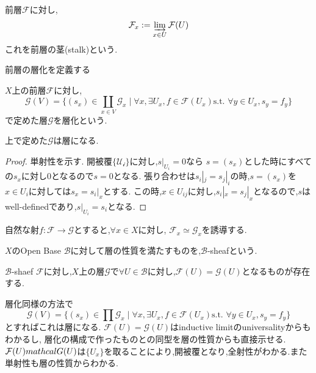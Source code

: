 前層$\mathcal{F}$に対し,
\begin{equation*}
    \mathcal{F}_x := \varinjlim_{x \in U}\mathcal{F}(U)
\end{equation*}
これを前層の茎(stalk)という.

前層の層化を定義する
\begin{screen}
\begin{dfn}[層化]
$X$上の前層$\mathcal{F}$に対し,
\begin{equation*}
\mathcal{G}(V)= \{ (s_x) \in \coprod_{x \in V} \mathcal{G}_x \mid \forall x, \exists U_x ,f  \in \mathcal{F}(U_x) \mbox{s.t. } \forall y \in U_x, s_y = f_y \}
\end{equation*}
で定めた層$\mathcal{G}$を層化という.
\end{dfn}
\end{screen}


\begin{lem}
上で定めた$\mathcal{G}$は層になる.
\end{lem}
\begin{proof}
単射性を示す.
開被覆$\{\mathcal{U_i}\}$に対し,$s|_{U_i} = 0$なら
$s = (s_x)$とした時にすべての$s_x$に対し$0$となるので$s = 0$となる.
張り合わせは$s_i|_j = s_j|_i$の時,$s = (s_x)$を$x \in U_i$に対しては$s_x =s_i|_x$とする.
この時,$x \in U_{ij}$に対し,$s_i|_x = s_j|_x$となるので,$s$はwell-definedであり,$s|_{U_i} = s_i$となる.
\end{proof}

\begin{lem}
自然な射$f: \mathcal{F} \to \mathcal{G}$とすると,$\forall x \in X$に対し,
$\mathcal{F}_x \simeq \mathcal{G}_x$を誘導する.
\end{lem}


\begin{screen}
\begin{dfn}
$X$のOpen Base $\mathcal{B}$に対して層の性質を満たすものを,$\mathcal{B}$-sheafという.
\end{dfn}
\end{screen}

\begin{lem}
$\mathcal{B}$-shaef $\mathcal{F}$に対し,$X$上の層$\mathcal{G}$で$\forall U \in \mathcal{B}$に対し,$\mathcal{F}(U) = \mathcal{G}(U)$となるものが存在する.
\end{lem}
層化同様の方法で
\begin{equation*}
\mathcal{G}(V)= \{ (s_x) \in \prod \mathcal{G}_x \mid \forall x, \exists U_x ,f  \in \mathcal{F}(U_x) \mbox{s.t. } \forall y \in U_x, s_y = f_y \}
\end{equation*}
とすればこれは層になる.
$\mathcal{F}(U) = \mathcal{G}(U)$はinductive limitのuniversalityからもわかるし,
層化の構成で作ったものとの同型を層の性質からも直接示せる.
$\mathcal{F}(U) \\mathcal{G}(U)$は$\{U_x \}$を取ることにより,開被覆となり,全射性がわかる.また単射性も層の性質からわかる.

